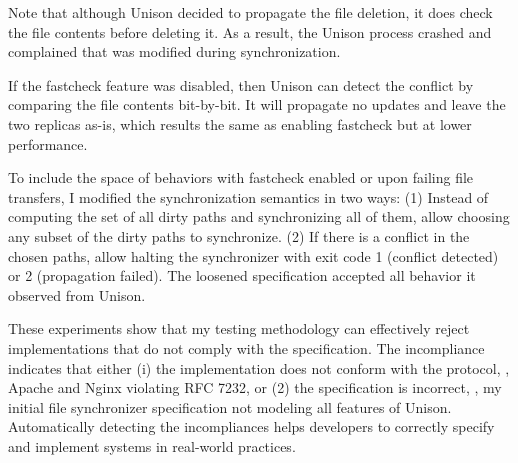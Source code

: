 Note that although Unison decided to propagate the file deletion, it does
check the file contents before deleting it.  As a result, the Unison process
crashed and complained that  was modified during synchronization.

If the fastcheck feature was disabled, then Unison can detect the conflict by
comparing the file contents bit-by-bit.  It will propagate no updates and leave
the two replicas as-is, which results the same as enabling fastcheck but at
lower performance.

To include the space of behaviors with fastcheck enabled or upon failing file
transfers, I modified the synchronization semantics in two ways: (1) Instead of
computing the set of all dirty paths and synchronizing all of them, allow
choosing any subset of the dirty paths to synchronize.  (2) If there is a
conflict in the chosen paths, allow halting the synchronizer with exit code 1
(conflict detected) or 2 (propagation failed).  The loosened specification
accepted all behavior it observed from Unison.

These experiments show that my testing methodology can effectively reject
implementations that do not comply with the specification.  The incompliance
indicates that either (i) the implementation does not conform with the protocol,
\eg, Apache and Nginx violating RFC 7232, or (2) the specification is
incorrect, \eg, my initial file synchronizer specification not modeling all
features of Unison.  Automatically detecting the incompliances helps developers
to correctly specify and implement systems in real-world practices.

